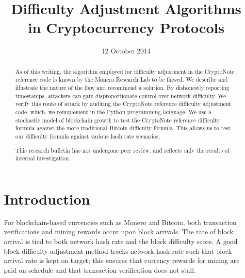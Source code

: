 \documentclass[12pt,english]{mrl}
\theoremstyle{definition}
\numberwithin{equation}{section}
\numberwithin{figure}{section}
\numberwithin{equation}{section}
\numberwithin{equation}{section}
\numberwithin{figure}{section}
\begin{document}
\begin{frontmatter}

\begin{fmbox}
\hfill\setlength{\fboxrule}{0px}\setlength{\fboxsep}{5px}
\title{Difficulty Adjustment Algorithms in Cryptocurrency Protocols}
\date{12 October 2014}
\author[
   addressref={mrl},
   email={lab@monero.cc}
]{ }
\author[
   addressref={mrl}
   email={lab@monero.cc}
]{ }


\address[id=mrl]{
}
\end{fmbox}

\begin{abstractbox}
\begin{abstract}
As of this writing, the algorithm employed for difficulty adjustment in the CryptoNote reference code is known by the Monero Research Lab to be flawed. We describe and illustrate the nature of the flaw and recommend a solution. By dishonestly reporting timestamps, attackers can gain disproportionate control over network difficulty.  We verify this route of attack by auditing the CryptoNote reference difficulty adjustment code, which, we reimplement in the Python programming language.  We use a stochastic model of blockchain growth to test the CryptoNote reference difficulty formula against the more traditional Bitcoin difficulty formula. This allows us to test our difficulty formula against various hash rate scenarios.

This research bulletin has not undergone peer review, and reflects only the results of internal investigation.
\end{abstract}
\end{abstractbox}
\end{frontmatter}

\section{Introduction}\label{intro}

For blockchain-based currencies such as Monero and Bitcoin, both transaction verifications and mining rewards occur upon block arrivals. The rate of block arrival is tied to both network hash rate and the block difficulty score. A good block difficulty adjustment method tracks network hash rate such that block arrival rate is kept on target; this ensures that currency rewards for mining are paid on schedule and that transaction verification does not stall.
\end{document}
